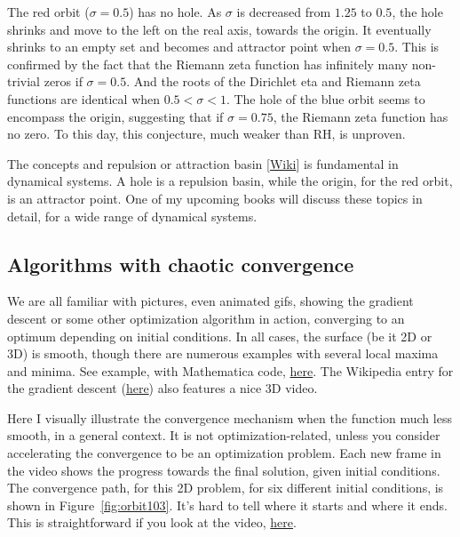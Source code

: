 \documentclass[oneside,10pt]{book}
\begin{document}
The red orbit ($\sigma=0.5$) has no hole. As $\sigma$ is decreased from $1.25$ to $0.5$, the hole shrinks and move to the left on the real axis, towards the origin. It eventually shrinks 
to an empty set and becomes and attractor point when $\sigma=0.5$. This is confirmed by the fact that the Riemann zeta function has infinitely many non-trivial zeros if $\sigma=0.5$. And the roots of the Dirichlet eta and Riemann zeta functions are identical when $0.5 < \sigma < 1$. The hole of the blue orbit seems to
encompass the origin, suggesting that if $\sigma=0.75$, the Riemann zeta function has no zero. To this day, this conjecture, much weaker than RH, is unproven.

The concepts and repulsion or \textcolor{index}{attraction basin} [\href{https://en.wikipedia.org/wiki/Attractor}{Wiki}] is fundamental in dynamical systems.
A hole is a repulsion basin, while the origin, for the red orbit, is an attractor point. One of my upcoming books will discuss these topics in detail, for a wide
range of dynamical systems.

\subsection{Algorithms with chaotic convergence}\label{psr55}

We are all familiar with pictures, even animated gifs, showing the gradient descent or some other optimization algorithm in action, converging to an optimum depending on initial conditions. In all cases, the surface (be it 2D or 3D) is smooth, though there are numerous examples with several local maxima and minima. See example, with Mathematica code, \href{https://commons.wikimedia.org/wiki/File:Gradient_descent.gif}{here}. The Wikipedia entry for the gradient descent
(\href{https://en.wikipedia.org/wiki/Gradient_descent}{here}) also features a nice 3D video. 

Here I visually illustrate the convergence mechanism when the function much less smooth, in a general context. It is not optimization-related, unless you consider 
accelerating the convergence to be an optimization problem. Each new frame in the video shows the progress towards the final solution, given initial conditions. The convergence path, for this 2D problem, for six different initial conditions, is shown in Figure~\ref{fig:orbit103}.
It's hard to tell where it starts and where it ends. This is straightforward if you look at the video, \href{https://www.youtube.com/watch?v=XI5MhyNc7us}{here}.
\end{document}
